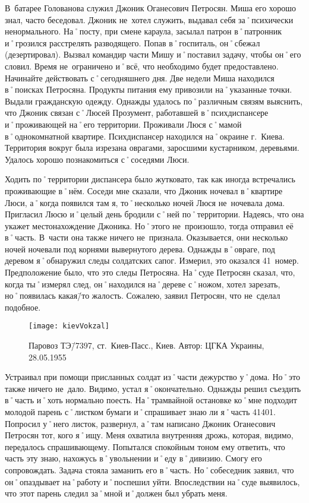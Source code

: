 В~батарее Голованова служил Джоник Оганесович Петросян. Миша его хорошо знал, часто беседовал. Джоник не~хотел служить, выдавал себя за˚психически ненормального. На˚посту, при смене караула, засылал патрон в˚патронник и˚грозился расстрелять разводящего. Попав в˚госпиталь, он˚сбежал (дезертировал). Вызвал командир части Мишу и˚поставил задачу, чтобы он˚его словил. Время не~ограничено и˚всё, что необходимо будет предоставлено. Начинайте действовать с˚сегодняшнего дня. Две недели Миша находился в˚поисках Петросяна. Продукты питания ему привозили на˚указанные точки. Выдали гражданскую одежду. Однажды удалось по˚различным связям выяснить, что Джоник связан с˚Люсей Прозумент, работавшей в˚психдиспансере и˚проживающей на˚его территории. Проживали Люся с˚мамой в˚однокомнатной квартире. Психдиспансер находился на˚окраине г.~Киева. Территория вокруг была изрезана оврагами, заросшими кустарником, деревьями. Удалось хорошо познакомиться с˚соседями Люси. 

Ходить по˚территории диспансера было жутковато, так как иногда встречались проживающие в˚нём. Соседи мне сказали, что Джоник ночевал в˚квартире Люси, а˚когда появился там я, то˚несколько ночей Люся не~ночевала дома. Пригласил Люсю и˚целый день бродили с˚ней по˚территории. Надеясь, что она укажет местонахождение Джоника. Но˚этого не~произошло, тогда отправил её в˚часть. В~части она также ничего не~признала. Оказывается, они несколько ночей ночевали под корнями вывернутого дерева. Однажды в˚овраге, под деревом я˚обнаружил следы солдатских сапог. Измерил, это оказался 41~номер. Предположение было, что это следы Петросяна. На˚суде Петросян сказал, что, когда ты˚измерял след, он˚находился на˚дереве с˚ножом, хотел зарезать, но˚появилась какая\=/то жалость. Сожалею, заявил Петросян, что не~сделал подобное.  

\begin{wrapfigure}{O}{.4\textwidth}
\centering
\texttt{[image: kievVokzal]}
\caption{Паровоз ТЭ\=/7397, ст.~Киев-Пасс., Киев. Автор: ЦГКА Украины, 28.05.1955}
\label{fig:kievVokzal}
\end{wrapfigure}

Устраивал при помощи присланных солдат из˚части дежурство у˚дома. Но˚это также ничего не~дало. Видимо, устал я˚окончательно. Однажды решил съездить в˚часть и˚хоть нормально поесть. На˚трамвайной остановке ко˚мне подходит молодой парень с˚листком бумаги и˚спрашивает знаю ли я˚часть 41401. Попросил у˚него листок, развернул, а˚там написано Джоник Оганесович Петросян тот, кого я˚ищу. Меня охватила внутренняя дрожь, которая, видимо, передалось спрашивающему. Попытался спокойным тоном ему ответить, что часть эту знаю, нахожусь в˚увольнении и˚еду в˚дивизию. Смогу его сопровождать. Задача стояла заманить его в˚часть. Но˚собеседник заявил, что он˚опаздывает на˚работу и˚поспешил уйти. Впоследствии на˚суде выявилось, что этот парень следил за˚мной и˚должен был убрать меня.

